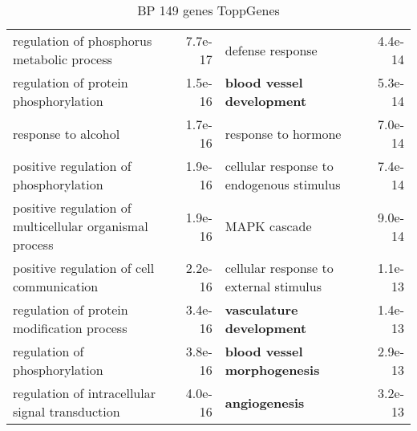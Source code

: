 \documentclass[fleqn,10pt]{SelfArx} %
\begin{document}
\begin{table}[ht]
\begin{tabularx}{\textwidth}{lRlR}
		regulation of phosphorus metabolic process & 7.7e-17 & defense response & 4.4e-14 \\ 
		regulation of protein phosphorylation & 1.5e-16 & \textbf{blood vessel development} & 5.3e-14 \\ 
		response to alcohol & 1.7e-16 & response to hormone & 7.0e-14 \\ 
		positive regulation of phosphorylation & 1.9e-16 & cellular response to endogenous stimulus & 7.4e-14 \\ 
		positive regulation of multicellular organismal process & 1.9e-16 & MAPK cascade & 9.0e-14 \\ 
		positive regulation of cell communication & 2.2e-16 & cellular response to external stimulus & 1.1e-13 \\ 
		regulation of protein modification process & 3.4e-16 & \textbf{vasculature development} & 1.4e-13 \\ 
		regulation of phosphorylation & 3.8e-16 & \textbf{blood vessel morphogenesis} & 2.9e-13 \\ 
		regulation of intracellular signal transduction & 4.0e-16 & \textbf{angiogenesis} & 3.2e-13 \\
	\end{tabularx}
	\smallskip
	\caption{BP 149 genes ToppGenes}
	\label{tab:bp149}
\end{table}
\end{document}
